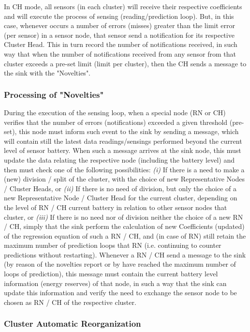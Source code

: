 \documentclass[conference]{IEEEtran}
\begin{document}
In CH mode, all sensors (in each cluster) will receive their respective
coefficients and will execute the process of sensing (reading/prediction loop).
But, in this case, whenever occurs a number of errors (misses) greater than the
limit error (per sensor) in a sensor node, that sensor send a
notification for its respective Cluster Head. This in turn record the number of
notifications received, in such way that when the number of notifications
received from any sensor from that cluster exceeds a pre-set limit (limit per
cluster), then the CH sends a message to the sink with the "Novelties".

\subsubsection{Processing of "Novelties"}

During the execution of the sensing loop, when a special node (RN or CH)
verifies that the number of errors (notifications) exceeded a given threshold
(pre-set), this node must inform such event to the sink by sending a message,
which will contain still the latest data readings/sensings performed beyond the
current level of sensor battery. 
When such a message arrives at the sink node, this must update
the data relating the respective node (including the battery level) and then
must check one of the following possibilities: {\it (i)} If there is a need to
make a (new) division / split of the cluster, with the choice of new
Representative Nodes / Cluster Heads, or {\it (ii)} If there is no need of
division, but only the choice of a new Representative Node / Cluster Head for
the current cluster, depending on the level of RN / CH current battery in
relation to other sensor nodes that cluster, or {\it (iii)} If there is no need
nor of division neither the choice of a new RN / CH, simply that the sink
perform the calculation of new Coefficients (updated) of the regression equation
of such a RN / CH, and (in case of RN) still retain the maximum number of
prediction loops that RN (i.e. continuing to counter predictions without
restarting).
Whenever a RN / CH send a message to the sink (by reason of the novelties report
or by have reached the maximum number of loops of prediction), this message must
contain the current battery level information (energy reserves) of that node, in
such a way that the sink can update this information and verify the need to
exchange the sensor node to be chosen as RN / CH of the respective cluster.

\subsubsection{Cluster Automatic Reorganization}
\end{document}

